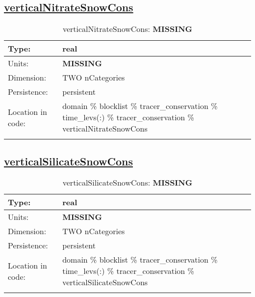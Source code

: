 \subsection[verticalNitrateSnowCons]{\hyperref[sec:var_tab_tracer_conservation]{verticalNitrateSnowCons}}
\label{subsec:var_sec_tracer_conservation_verticalNitrateSnowCons}
\begin{center}
\begin{longtable}{| p{2.0in} | p{4.0in} |}
        \hline 
        Type: & real \\
        \hline 
        Units: & {\bf \color{red} MISSING} \\
        \hline 
        Dimension: & TWO nCategories \\
        \hline 
        Persistence: & persistent \\
        \hline 
         Location in code: & domain \% blocklist \% tracer\_conservation \% time\_levs(:) \% tracer\_conservation \% verticalNitrateSnowCons \\
         \hline 
    \caption{verticalNitrateSnowCons: {\bf \color{red} MISSING}}
\end{longtable}
\end{center}
\subsection[verticalSilicateSnowCons]{\hyperref[sec:var_tab_tracer_conservation]{verticalSilicateSnowCons}}
\label{subsec:var_sec_tracer_conservation_verticalSilicateSnowCons}
\begin{center}
\begin{longtable}{| p{2.0in} | p{4.0in} |}
        \hline 
        Type: & real \\
        \hline 
        Units: & {\bf \color{red} MISSING} \\
        \hline 
        Dimension: & TWO nCategories \\
        \hline 
        Persistence: & persistent \\
        \hline 
         Location in code: & domain \% blocklist \% tracer\_conservation \% time\_levs(:) \% tracer\_conservation \% verticalSilicateSnowCons \\
         \hline 
    \caption{verticalSilicateSnowCons: {\bf \color{red} MISSING}}
\end{longtable}
\end{center}
